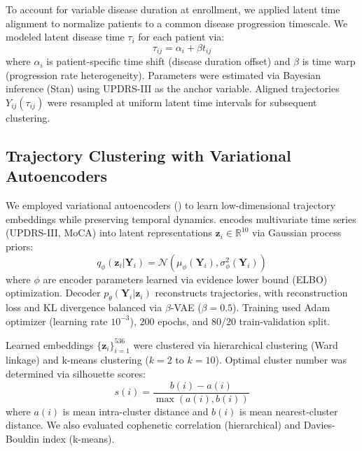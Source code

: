 To account for variable disease duration at enrollment, we applied latent time alignment\cite{donohue2014preclinical} to normalize patients to a common disease progression timescale. We modeled latent disease time $\tau_i$ for each patient via:
\begin{equation}
\tau_{ij} = \alpha_i + \beta t_{ij}
\end{equation}
where $\alpha_i$ is patient-specific time shift (disease duration offset) and $\beta$ is time warp (progression rate heterogeneity). Parameters were estimated via Bayesian inference (Stan)\cite{carpenter2017stan} using UPDRS-III as the anchor variable. Aligned trajectories $Y_{ij}(\tau_{ij})$ were resampled at uniform latent time intervals for subsequent clustering.

\subsection{Trajectory Clustering with Variational Autoencoders}

We employed variational autoencoders (\vader)\cite{fortuin2020gp} to learn low-dimensional trajectory embeddings while preserving temporal dynamics. \vader{} encodes multivariate time series (UPDRS-III, MoCA) into latent representations $\mathbf{z}_i \in \mathbb{R}^{10}$ via Gaussian process priors\cite{fortuin2020gp}:
\begin{equation}
q_\phi(\mathbf{z}_i | \mathbf{Y}_i) = \mathcal{N}(\mu_\phi(\mathbf{Y}_i), \sigma_\phi^2(\mathbf{Y}_i))
\end{equation}
where $\phi$ are encoder parameters learned via evidence lower bound (ELBO) optimization. Decoder $p_\theta(\mathbf{Y}_i | \mathbf{z}_i)$ reconstructs trajectories, with reconstruction loss and KL divergence balanced via $\beta$-VAE ($\beta=0.5$). Training used Adam optimizer (learning rate $10^{-3}$), 200 epochs, and 80/20 train-validation split.

Learned embeddings $\{\mathbf{z}_i\}_{i=1}^{536}$ were clustered via hierarchical clustering (Ward linkage) and k-means clustering ($k=2$ to $k=10$). Optimal cluster number was determined via silhouette scores\cite{rousseeuw1987silhouettes}:
\begin{equation}
s(i) = \frac{b(i) - a(i)}{\max(a(i), b(i))}
\end{equation}
where $a(i)$ is mean intra-cluster distance and $b(i)$ is mean nearest-cluster distance. We also evaluated cophenetic correlation (hierarchical) and Davies-Bouldin index (k-means).

